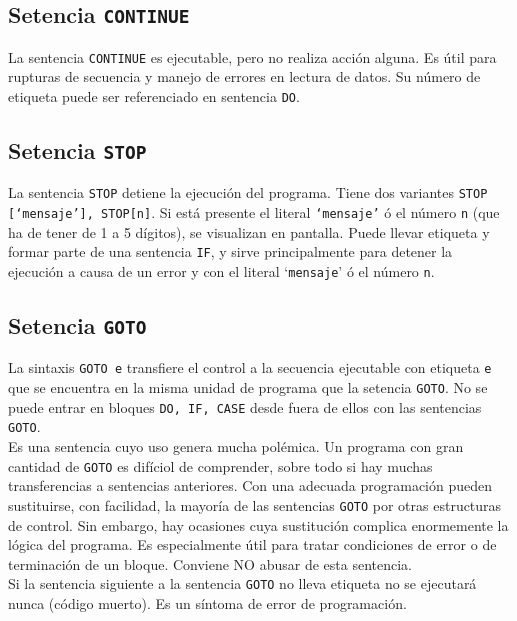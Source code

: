 \subsection{Setencia {\tt CONTINUE}}

La sentencia \texttt{CONTINUE} es ejecutable, pero no realiza acción alguna. Es útil para rupturas de secuencia y manejo de errores en lectura de datos. Su número de etiqueta puede ser referenciado en sentencia \texttt{DO}.

\subsection{Setencia {\tt STOP}}

La sentencia {\tt STOP} detiene la ejecución del programa. Tiene dos variantes {\tt STOP [`mensaje'], STOP[n]}. Si está presente el literal {\tt `mensaje'} ó el número {\tt  n} (que ha de tener de 1 a 5 dígitos), se visualizan en pantalla. Puede llevar etiqueta y formar parte de una sentencia {\tt IF}, y sirve principalmente para detener la ejecución a causa de un error y con el literal `{\tt mensaje}' ó el número {\tt n}.

\subsection{Setencia {\tt GOTO}}

La sintaxis {\tt GOTO e} transfiere el control a la secuencia ejecutable con etiqueta {\tt e} que se encuentra en la misma unidad de programa que la setencia {\tt GOTO}. No se puede entrar en bloques {\tt DO, IF, CASE} desde fuera de ellos con las sentencias {\tt GOTO}. \\

Es una sentencia cuyo uso genera mucha polémica. Un programa con gran cantidad de {\tt GOTO} es difíciol de comprender, sobre todo si hay muchas transferencias a sentencias anteriores. Con una adecuada programación pueden sustituirse, con facilidad, la mayoría de las sentencias {\tt GOTO} por otras estructuras de control. Sin embargo, hay ocasiones cuya sustitución complica enormemente la lógica del programa. Es especialmente útil para tratar condiciones de error o de terminación de un bloque. Conviene NO abusar de esta sentencia. \\

Si la sentencia siguiente a la sentencia {\tt GOTO} no lleva etiqueta no se ejecutará nunca (código muerto). Es un síntoma de error de programación.


